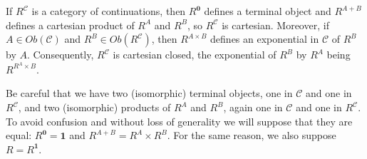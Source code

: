 \documentclass{CSML}
\newcommand*\CatC{\mathcal{C}}
\newcommand*\CatObj[1]{Ob\left(#1\right)}
\newcommand*\CatObjA{A}
\newcommand*\CatObjB{B}
\newcommand*\CatR{R}
\newcommand*\CatRC{\CatExp{\CatR}{\CatC}}
\newcommand*\CatTimes\times
\newcommand*\CatPlus{+}
\newcommand*\CatExp[2]{#1^{#2}}
\newcommand*\CatTerm{\mathbf{1}}
\newcommand*\CatInit{\mathbf{0}}
\begin{document}
\begin{lem}
If $\CatRC$ is a category of continuations, then $\CatExp{\CatR}{\CatInit}$ defines a terminal object and $\CatExp{\CatR}{\CatObjA\CatPlus\CatObjB}$ defines a cartesian product of $\CatExp{\CatR}{\CatObjA}$ and $\CatExp{\CatR}{\CatObjB}$, so $\CatRC$ is cartesian. Moreover, if $\CatObjA\in\CatObj{\CatC}$ and $\CatExp{\CatR}{\CatObjB}\in\CatObj{\CatRC}$, then $\CatExp{\CatR}{\CatObjA\CatTimes\CatObjB}$ defines an exponential in $\CatC$ of $\CatExp{\CatR}{\CatObjB}$ by $\CatObjA$. Consequently, $\CatRC$ is cartesian closed, the exponential of $\CatExp{\CatR}{\CatObjB}$ by $\CatExp{\CatR}{\CatObjA}$ being $\CatExp{\CatR}{\CatExp{\CatR}{\CatObjA}\CatTimes\CatObjB}$.
\end{lem}
Be careful that we have two (isomorphic) terminal objects, one in $\CatC$ and one in $\CatRC$, and two (isomorphic) products of $\CatExp{\CatR}{\CatObjA}$ and $\CatExp{\CatR}{\CatObjB}$, again one in $\CatC$ and one in $\CatRC$. To avoid confusion and without loss of generality we will suppose that they are equal: $\CatExp{\CatR}{\CatInit}=\CatTerm$ and $\CatExp{\CatR}{\CatObjA\CatPlus\CatObjB}=\CatExp{\CatR}{\CatObjA}\CatTimes\CatExp{\CatR}{\CatObjB}$. For the same reason, we also suppose $\CatR=\CatExp{\CatR}{\CatTerm}$.
\end{document}
